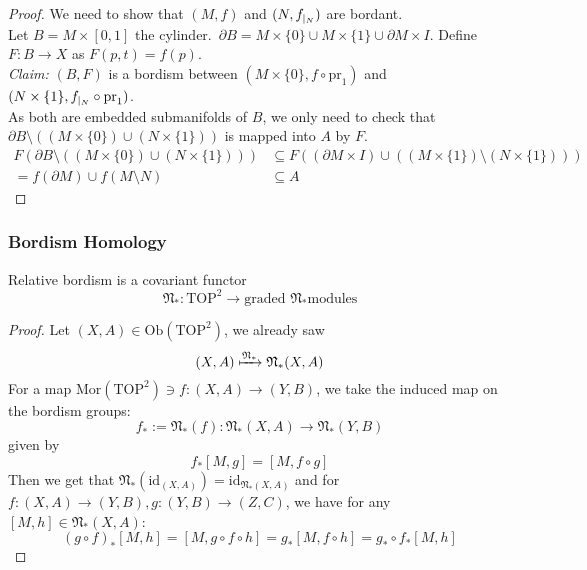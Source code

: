 \documentclass[a4paper,11pt]{article}
\begin{document}
\begin{proof}\cite{tomdieck}
    We need to show that \((M,f)\) and \((N,f_{|_{N}})\) are bordant.\\
    Let \(B=M\times [0,1]\) the cylinder.\ \(\partial B= M\times\{0\}\cup M\times\{1\}\cup \partial M\times I\). Define \(F:B\to X\) as \(F(p,t)=f(p)\).\\
    \textit{Claim:} \((B,F)\) is a bordism between \((M\times \{0\},f\circ\mathrm{pr}_1)\) and \((N\times \{1\}, f_{|_{N}}\circ\mathrm{pr}_1)\).\\
    As both are embedded submanifolds of \(B\), we only need to check that \(\partial B\setminus((M\times \{0\})\cup (N\times\{1\}))\) is mapped into \(A\) by \(F\).
    \begin{align*}
        F(\partial B\setminus((M\times \{0\})\cup (N\times\{1\})))&\subseteq F((\partial M\times I)\cup ((M\times\{1\})\setminus (N\times \{1\})))\\
        =f(\partial M)\cup f(M\setminus N)&\subseteq A
    \end{align*}
\end{proof}

\subsubsection{Bordism Homology}

\begin{lemma}\cite[II, Satz 3.2]{brocker}\label{functoriality}
    Relative bordism is a covariant functor \[\mathfrak{N}_\ast:\mathrm{TOP}^2\to\text{graded \(\mathfrak{N}_\ast\)modules}\]
\end{lemma}

\begin{proof}\cite{brocker} 
    Let \((X,A)\in\mathrm{Ob}(\mathrm{TOP}^2)\), we already saw
    \[(X,A)\xmapsto{\mathfrak{N}_\ast}\mathfrak{N}_\ast(X,A)\]
    For a map \(\mathrm{Mor}(\mathrm{TOP}^2)\ni f:(X,A)\to(Y,B)\), we take the induced map on the bordism groups:
    \[f_\ast:=\mathfrak{N}_\ast(f):\mathfrak{N}_\ast(X,A)\to\mathfrak{N}_\ast(Y,B)\]
    given by 
    \[f_\ast[M,g] = [M,f\circ g]\]
    Then we get that \(\mathfrak{N}_\ast(\mathrm{id}_{(X,A)})=\mathrm{id}_{\mathfrak{N}_\ast(X,A)}\) and for \(f:(X,A)\to(Y,B), g:(Y,B)\to(Z,C)\), we have for any \([M,h]\in\mathfrak{N}_\ast(X,A)\):
    \[{(g\circ f)}_{\ast}[M,h]=[M,g\circ f\circ h]=g_\ast[M,f\circ h]=g_\ast\circ f_\ast[M,h]\]
\end{proof}
\end{document}
